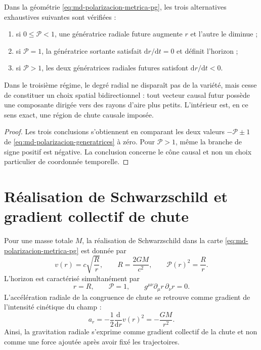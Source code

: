 \begin{theorem}
\label{thm:md-polarizacion-caida-obligada}
Dans la géométrie \eqref{eq:md-polarizacion-metrica-pg}, les
trois alternatives exhaustives suivantes sont vérifiées :
\begin{enumerate}
 \item si \(0\leq\mathcal P<1\), une génératrice radiale future augmente \(r\)
 et l'autre le diminue ;
 \item si \(\mathcal P=1\), la génératrice sortante satisfait
 \(\mathrm dr/\mathrm dt=0\) et définit l'horizon ;
 \item si \(\mathcal P>1\), les deux génératrices radiales futures satisfont
 \(\mathrm dr/\mathrm dt<0\).
\end{enumerate}
Dans le troisième régime, le degré radial ne disparaît pas de la variété, mais cesse
de constituer un choix spatial bidirectionnel : tout vecteur causal futur
possède une composante dirigée vers des rayons d'aire plus petits. L'intérieur est, en
ce sens exact, une région de chute causale imposée.
\end{theorem}

\begin{proof}
Les trois conclusions s'obtiennent en comparant les deux valeurs
\(-\mathcal P\pm1\) de \eqref{eq:md-polarizacion-generatrices} à zéro. Pour
\(\mathcal P>1\), même la branche de signe positif est négative. La
conclusion concerne le cône causal et non un choix particulier de
coordonnée temporelle.
\end{proof}

\section{Réalisation de Schwarzschild et gradient collectif de chute}
\label{sec:md-polarizacion-schwarzschild}

Pour une masse totale \(M\), la réalisation de Schwarzschild dans la carte
\eqref{eq:md-polarizacion-metrica-pg} est donnée par
\begin{equation}
 v(r)=c\sqrt{\frac{R}{r}},
 \qquad
 R=\frac{2GM}{c^2},
 \qquad
 \mathcal P(r)^2=\frac{R}{r}.
 \label{eq:md-polarizacion-schwarzschild}
\end{equation}
L'horizon est caractérisé simultanément par
\begin{equation}
 r=R,
 \qquad
 \mathcal P=1,
 \qquad
 g^{\mu\nu}\partial_\mu r\,\partial_\nu r=0.
 \label{eq:md-polarizacion-horizonte}
\end{equation}
L'accélération radiale de la congruence de chute se retrouve comme gradient
de l'intensité cinétique du champ :
\begin{equation}
 a_r=-\frac12\frac{\mathrm d}{\mathrm dr}v(r)^2
 =-\frac{GM}{r^2}.
 \label{eq:md-polarizacion-gradiente}
\end{equation}
Ainsi, la gravitation radiale s'exprime comme gradient collectif de la chute et
non comme une force ajoutée après avoir fixé les trajectoires.

